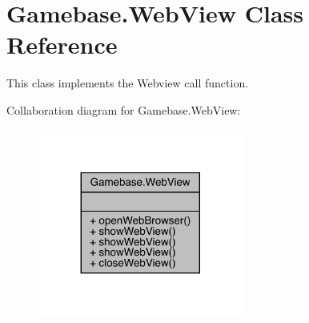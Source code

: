 \hypertarget{classcom_1_1toast_1_1android_1_1gamebase_1_1_gamebase_1_1_web_view}{}\section{Gamebase.\+Web\+View Class Reference}
\label{classcom_1_1toast_1_1android_1_1gamebase_1_1_gamebase_1_1_web_view}


This class implements the Webview call function.  




Collaboration diagram for Gamebase.\+Web\+View\+:
\nopagebreak
\begin{figure}[H]
\begin{center}
\leavevmode
\includegraphics[width=191pt]{classcom_1_1toast_1_1android_1_1gamebase_1_1_gamebase_1_1_web_view__coll__graph}
\end{center}
\end{figure}
